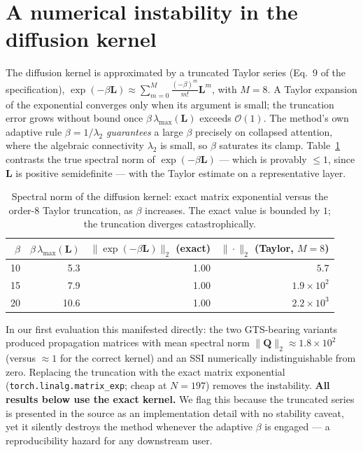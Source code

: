 \documentclass[11pt]{article}
\newcommand{\Lap}{\mathbf{L}}
\newcommand{\Q}{\mathbf{Q}}
\begin{document}
\section{A numerical instability in the diffusion kernel}
\label{sec:bug}

The diffusion kernel is approximated by a truncated Taylor series
(Eq.~9 of the specification),
$\exp(-\beta\Lap)\approx\sum_{m=0}^{M}\frac{(-\beta)^m}{m!}\Lap^{m}$,
with $M=8$. A Taylor expansion of the exponential converges only when its
argument is small; the truncation error grows without bound once
$\beta\,\lambda_{\max}(\Lap)$ exceeds $\mathcal{O}(1)$. The method's own
adaptive rule $\beta=1/\lambda_2$ \emph{guarantees} a large $\beta$ precisely on
collapsed attention, where the algebraic connectivity $\lambda_2$ is small, so
$\beta$ saturates its clamp. Table~\ref{tab:taylor} contrasts the true spectral
norm of $\exp(-\beta\Lap)$ --- which is provably $\le 1$, since $\Lap$ is
positive semidefinite --- with the Taylor estimate on a representative layer.

\begin{table}[h]
\centering
\caption{Spectral norm of the diffusion kernel: exact matrix exponential
versus the order-$8$ Taylor truncation, as $\beta$ increases. The exact value
is bounded by $1$; the truncation diverges catastrophically.}
\label{tab:taylor}
\begin{tabular}{r r r r}
\toprule
$\beta$ & $\beta\,\lambda_{\max}(\Lap)$ & $\|\exp(-\beta\Lap)\|_2$ (exact) & $\|\cdot\|_2$ (Taylor, $M{=}8$) \\
\midrule
10 & 5.3  & 1.00 & $5.7$ \\
15 & 7.9  & 1.00 & $1.9\times 10^{2}$ \\
20 & 10.6 & 1.00 & $2.2\times 10^{3}$ \\
\bottomrule
\end{tabular}
\end{table}

In our first evaluation this manifested directly: the two GTS-bearing variants
produced propagation matrices with mean spectral norm
$\|\Q\|_2\approx 1.8\times 10^{2}$ (versus $\approx 1$ for the correct kernel)
and an SSI numerically indistinguishable from zero. Replacing the truncation
with the exact matrix exponential (\texttt{torch.linalg.matrix\_exp}; cheap at
$N=197$) removes the instability. \textbf{All results below use the exact
kernel.} We flag this because the truncated series is presented in the source
as an implementation detail with no stability caveat, yet it silently destroys
the method whenever the adaptive $\beta$ is engaged --- a reproducibility hazard
for any downstream user.
\end{document}
